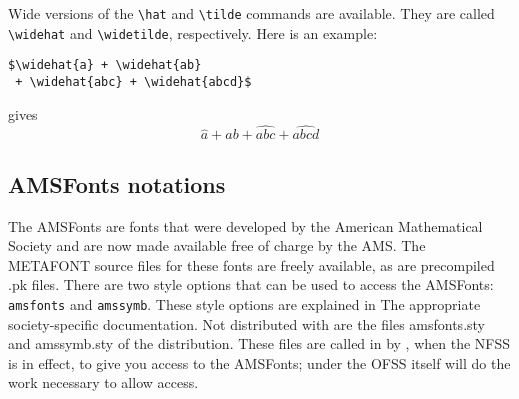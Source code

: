 Wide versions of the \verb+\hat+ and \verb+\tilde+ commands are available.
They are called \verb+\widehat+ and \verb+\widetilde+, respectively.
Here is an example:
\begin{verbatim}
$\widehat{a} + \widehat{ab}
 + \widehat{abc} + \widehat{abcd}$
\end{verbatim}
gives
\[
\widehat{a} + \widehat{ab} + \widehat{abc} + \widehat{abcd}
\]




\subsection{AMSFonts notations}
\label{AMSFonts,notations}


The AMSFonts are fonts that were developed by the American Mathematical Society
and are now made available free of charge by the AMS. The METAFONT source
files for these
fonts are freely available, as are precompiled .pk files. There are two style
options that can be used to access the AMSFonts:
\verb+amsfonts+ and \verb+amssymb+. These style options are explained in
The appropriate society-specific documentation. Not distributed
with \REVTeX{} are the files amsfonts.sty and amssymb.sty of the
\AmSLaTeX{} distribution.
These files are called in by \REVTeX{}, when the NFSS is in effect,
to give you access
to the AMSFonts; under the OFSS \REVTeX{} itself will do the work necessary
to allow access.


